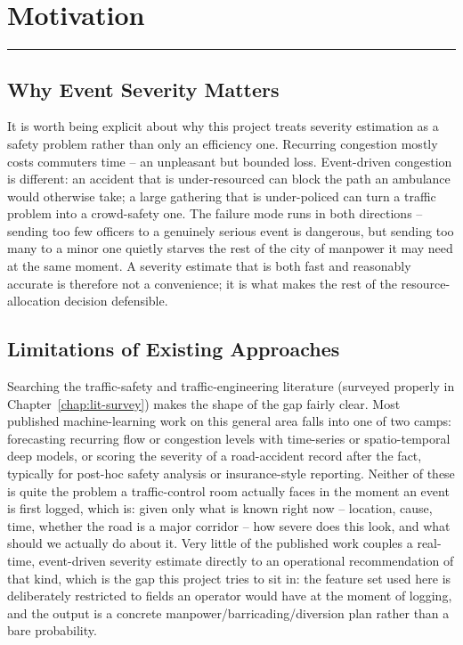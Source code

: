 \chapter{Motivation}
\label{chap:motivation}
\noindent \rule{6.6in}{0.01in}
\newpage

\section{Why Event Severity Matters}

It is worth being explicit about why this project treats severity estimation as a safety problem rather than only an efficiency one. Recurring congestion mostly costs commuters time -- an unpleasant but bounded loss. Event-driven congestion is different: an accident that is under-resourced can block the path an ambulance would otherwise take; a large gathering that is under-policed can turn a traffic problem into a crowd-safety one. The failure mode runs in both directions -- sending too few officers to a genuinely serious event is dangerous, but sending too many to a minor one quietly starves the rest of the city of manpower it may need at the same moment. A severity estimate that is both fast and reasonably accurate is therefore not a convenience; it is what makes the rest of the resource-allocation decision defensible.

\section{Limitations of Existing Approaches}

Searching the traffic-safety and traffic-engineering literature (surveyed properly in Chapter~\ref{chap:lit-survey}) makes the shape of the gap fairly clear. Most published machine-learning work on this general area falls into one of two camps: forecasting recurring flow or congestion levels with time-series or spatio-temporal deep models, or scoring the severity of a road-accident record after the fact, typically for post-hoc safety analysis or insurance-style reporting. Neither of these is quite the problem a traffic-control room actually faces in the moment an event is first logged, which is: given only what is known right now -- location, cause, time, whether the road is a major corridor -- how severe does this look, and what should we actually do about it. Very little of the published work couples a real-time, event-driven severity estimate directly to an operational recommendation of that kind, which is the gap this project tries to sit in: the feature set used here is deliberately restricted to fields an operator would have at the moment of logging, and the output is a concrete manpower/barricading/diversion plan rather than a bare probability.


